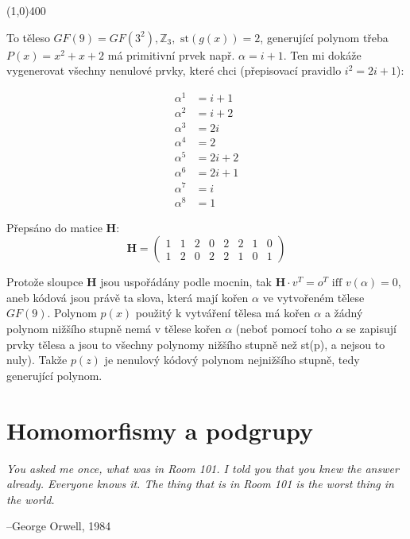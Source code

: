 \documentclass{article}
\begin{document}
\line(1,0){400}

To těleso $GF(9) = GF(3^2), \mathbb{Z}_3, \mbox{ st}(g(x)) = 2$, generující polynom třeba $P(x) = x^2 + x + 2$ má primitivní prvek např. $\alpha = i+1$. Ten mi dokáže vygenerovat všechny nenulové prvky, které chci (přepisovací pravidlo $i^2 = 2i+1$): 

\begin{align*}
\alpha^1 & = i + 1\\
\alpha^2 & = i + 2\\
\alpha^3 & = 2i\\
\alpha^4 & = 2\\
\alpha^5 & = 2i+2\\
\alpha^6 & = 2i+1\\
\alpha^7 & = i\\
\alpha^8 & = 1
\end{align*}

Přepsáno do matice $\mathbf{H}$:
\[
	\mathbf{H} = \begin{pmatrix}
 1 & 1 & 2 & 0 & 2 & 2 & 1 & 0\\
 1 & 2 & 0 & 2 & 2 & 1 & 0 & 1  
  \end{pmatrix}
\]

Protože sloupce $\mathbf{H}$ jsou uspořádány podle mocnin, tak $\mathbf{H}\cdot v^T=o^T \mbox{ iff } v(\alpha)=0$, aneb kódová jsou právě ta slova, která mají kořen $\alpha$ ve vytvořeném tělese $GF(9)$. Polynom $p(x)$ použitý k vytváření tělesa má kořen $\alpha$ a žádný polynom nižšího stupně nemá v tělese kořen $\alpha$ (neboť pomocí toho $\alpha$ se zapisují prvky tělesa a jsou to všechny polynomy nižšího stupně než st(p), a nejsou to nuly). Takže $p(z)$ je nenulový kódový polynom nejnižšího stupně, tedy generující polynom. 

\clearpage

\section{\label{kapitola4}Homomorfismy a podgrupy}

\begin{flushright}
\parbox[h]{3in}{
\emph{You asked me once, what was in Room 101. I told you that you knew the answer already. Everyone knows it. The thing that is in Room 101 is the worst thing in the world.}
\begin{flushright}
--George Orwell, 1984
\end{flushright}
}
\end{flushright}
\end{document}
